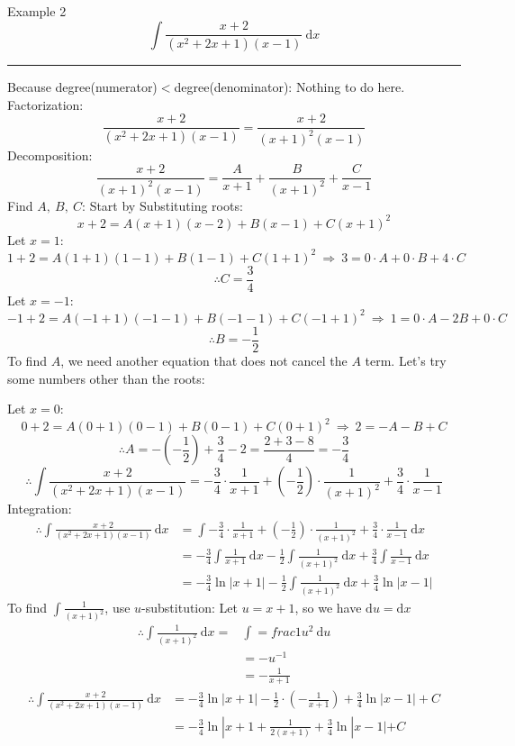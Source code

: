 \documentclass[12pt,a4paper]{article}
\def\d{{\mathrm{d}}}
\begin{document}
\begin{eg}{Example 2}
	$$\int\frac{x+2}{(x^2+2x+1)(x-1)}\ \d x$$
	\noindent\rule[0.25\baselineskip]{\textwidth}{1pt}
	Because degree(numerator)$<$degree(denominator): Nothing to do here.\\
	Factorization:
	$$\frac{x+2}{(x^2+2x+1)(x-1)}=\frac{x+2}{(x+1)^2(x-1)}$$
	Decomposition: 
	$$\frac{x+2}{(x+1)^2(x-1)}=\frac{A}{x+1}+\frac{B}{(x+1)^2}+\frac{C}{x-1}$$
	Find $A,\ B,\ C$: 
	Start by Substituting roots: 
	$$x+2=A(x+1)(x-2)+B(x-1)+C(x+1)^2$$
	\quad Let $x=1$: $$1+2=A(1+1)(1-1)+B(1-1)+C(1+1)^2\ \Rightarrow\ 3=0\cdot A+0\cdot B+4\cdot C$$
	$$\therefore C=\frac{3}{4}$$
	\quad Let $x=-1$: $$-1+2=A(-1+1)(-1-1)+B(-1-1)+C(-1+1)^2\ \Rightarrow\ 1=0\cdot A-2B+0\cdot C$$
	$$\therefore B=-\frac{1}{2}$$
	\quad To find $A$, we need another equation that does not cancel the $A$ term. Let's try some numbers other than the roots: \par
	\quad Let $x=0$: $$0+2=A(0+1)(0-1)+B(0-1)+C(0+1)^2\ \Rightarrow\ 2=-A-B+C$$
	$$\therefore A=-\left(-\frac{1}{2}\right)+\frac{3}{4}-2=\frac{2+3-8}{4}=-\frac{3}{4}$$
	$$\therefore\int\frac{x+2}{(x^2+2x+1)(x-1)}=-\frac{3}{4}\cdot\frac{1}{x+1}+\left(-\frac{1}{2}\right)\cdot\frac{1}{(x+1)^2}+\frac{3}{4}\cdot\frac{1}{x-1}$$
	Integration: 
	$$\begin{aligned}
		\therefore\int\frac{x+2}{(x^2+2x+1)(x-1)}\ \d x&=\int-\frac{3}{4}\cdot\frac{1}{x+1}+\left(-\frac{1}{2}\right)\cdot\frac{1}{(x+1)^2}+\frac{3}{4}\cdot\frac{1}{x-1}\ \d x\\
		&=-\frac{3}{4}\int\frac{1}{x+1}\ \d x-\frac{1}{2}\int\frac{1}{(x+1)^2}\ \d x+\frac{3}{4}\int\frac{1}{x-1}\ \d x\\
		&=-\frac{3}{4}\ln|x+1|-\frac{1}{2}\int\frac{1}{(x+1)^2}\ \d x+\frac{3}{4}\ln|x-1|
	\end{aligned}$$
	To find $\displaystyle\int\frac{1}{(x+1)^2}$, use $u$-substitution: Let $u=x+1$, so we have $\d u=\d x$
	$$\begin{aligned}
		\therefore\int\frac{1}{(x+1)^2}\ \d x=&\int=frac{1}{u^2}\ \d u\\
		&=-u^{-1}\\
		&=-\frac{1}{x+1}
	\end{aligned}$$
	$$\begin{aligned}
		\therefore\int\frac{x+2}{(x^2+2x+1)(x-1)}\ \d x&=-\frac{3}{4}\ln|x+1|-\frac{1}{2}\cdot\left(-\frac{1}{x+1}\right)+\frac{3}{4}\ln|x-1|+C\\
		&=-\frac{3}{4}\ln|x+1+\frac{1}{2(x+1)}+\frac{3}{4}\ln|x-1|+C
	\end{aligned}$$
\end{eg}
\end{document}
